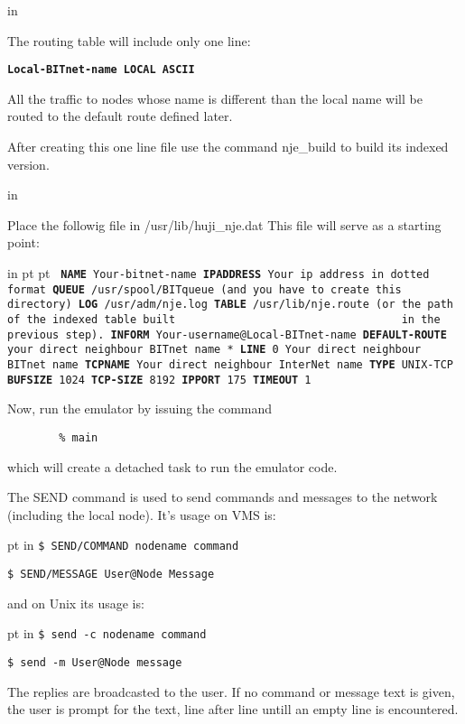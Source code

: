  in

The routing table will include only one line:

{\tt\bf Local-BITnet-name   LOCAL   ASCII}

All  the  traffic  to  nodes whose name is different than the local name
will be routed to the default route defined later.

After creating this one line file use the command nje\_build to  build
its indexed version.

 in

Place  the  followig  file  in
{\ncrBold /usr/lib/huji\_nje.dat} This file will
serve as a starting point:

 in
{\obeylines\obeyspaces{} pt  pt \tt
{\bf NAME}  Your-bitnet-name
{\bf IPADDRESS}  Your ip address in dotted format
{\bf QUEUE}  /usr/spool/BITqueue  (and you have to create this directory)
{\bf LOG}  /usr/adm/nje.log
{\bf TABLE}  /usr/lib/nje.route  (or the path of the indexed table built
~~~~~~~~~~~~~~~~~~~~~~~~~~~~~~~~~~in the previous step).
{\bf INFORM}  Your-username@Local-BITnet-name
{\bf DEFAULT-ROUTE}  your direct neighbour BITnet name
*
{\bf LINE}  0  Your direct neighbour BITnet name
{\bf TCPNAME}  Your direct neighbour InterNet name
{\bf TYPE}  UNIX-TCP
{\bf BUFSIZE}  1024
{\bf TCP-SIZE}  8192
{\bf IPPORT} 175
{\bf TIMEOUT}  1}

Now, run the emulator by issuing the command

{\tt ~~~~~~~~\% main}

which will create a detached task to run the emulator code.
\vfill\eject


The SEND command is used to send commands and messages to the network
(including the local node). It's usage on VMS is:

{ pt in
{\tt \$  SEND/COMMAND  nodename  command}

{\tt \$  SEND/MESSAGE  User@Node  Message}}

and on Unix its usage is:

{ pt in
{\tt \$  send  -c  nodename  command}

{\tt \$  send  -m  User@Node  message}}

The  replies  are broadcasted to the user. If no command or message text
is given, the user is prompt for the text, line  after  line  untill  an
empty line is encountered.

